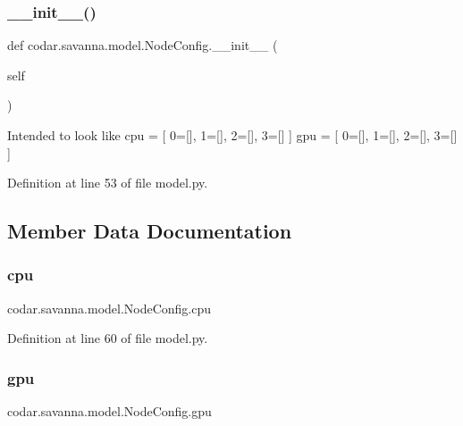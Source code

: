 \subsubsection{\texorpdfstring{\+\_\+\+\_\+init\+\_\+\+\_\+()}{\_\_init\_\_()}}
{\footnotesize\ttfamily def codar.\+savanna.\+model.\+Node\+Config.\+\_\+\+\_\+init\+\_\+\+\_\+ (\begin{DoxyParamCaption}\item[{}]{self }\end{DoxyParamCaption})}

\begin{DoxyVerb}Intended to look like
cpu = [ 0=[], 1=[], 2=[], 3=[] ]
gpu = [ 0=[], 1=[], 2=[], 3=[] ]
\end{DoxyVerb}
 

Definition at line 53 of file model.\+py.



\subsection{Member Data Documentation}
\mbox{\label{classcodar_1_1savanna_1_1model_1_1_node_config_ae3b3d48cf476cc01128973780c9ca256}} 
\subsubsection{\texorpdfstring{cpu}{cpu}}
{\footnotesize\ttfamily codar.\+savanna.\+model.\+Node\+Config.\+cpu}



Definition at line 60 of file model.\+py.

\mbox{\label{classcodar_1_1savanna_1_1model_1_1_node_config_a073c4acfc108df407fbd8ce570bade6b}} 
\subsubsection{\texorpdfstring{gpu}{gpu}}
{\footnotesize\ttfamily codar.\+savanna.\+model.\+Node\+Config.\+gpu}



